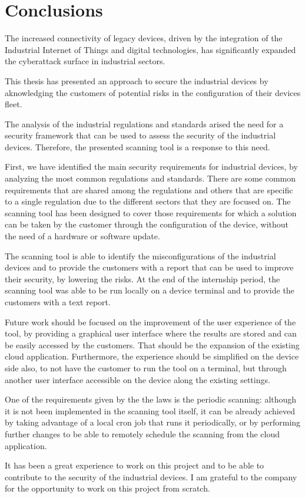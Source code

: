 \chapter{Conclusions}

The increased connectivity of legacy devices, driven by the integration of the Industrial Internet of Things and digital technologies, has significantly expanded the cyberattack surface in industrial sectors.

This thesis has presented an approach to secure the industrial devices by aknowledging the customers of potential risks in the configuration of their devices fleet.

The analysis of the industrial regulations and standards arised the need for a security framework that can be used to assess the security of the industrial devices. Therefore, the presented scanning tool is a response to this need.

First, we have identified the main security requirements for industrial devices, by analyzing the most common regulations and standards. There are some common requirements that are shared among the regulations and others that are specific to a single regulation due to the different sectors that they are focused on. The scanning tool has been designed to cover those requirements for which a solution can be taken by the customer through the configuration of the device, without the need of a hardware or software update.

The scanning tool is able to identify the misconfigurations of the industrial devices and to provide the customers with a report that can be used to improve their security, by lowering the risks. At the end of the internship period, the scanning tool was able to be run locally on a device terminal and to provide the customers with a text report.

Future work should be focused on the improvement of the user experience of the tool, by providing a graphical user interface where the results are stored and can be easily accessed by the customers. That should be the expansion of the existing cloud application. Furthermore, the experience should be simplified on the device side also, to not have the customer to run the tool on a terminal, but through another user interface accessible on the device along the existing settings.

One of the requirements given by the the laws is the periodic scanning: although it is not been implemented in the scanning tool itself, it can be already achieved by taking advantage of a local cron job that runs it periodically, or by performing further changes to be able to remotely schedule the scanning from the cloud application.

It has been a great experience to work on this project and to be able to contribute to the security of the industrial devices. I am grateful to the company for the opportunity to work on this project from scratch.
